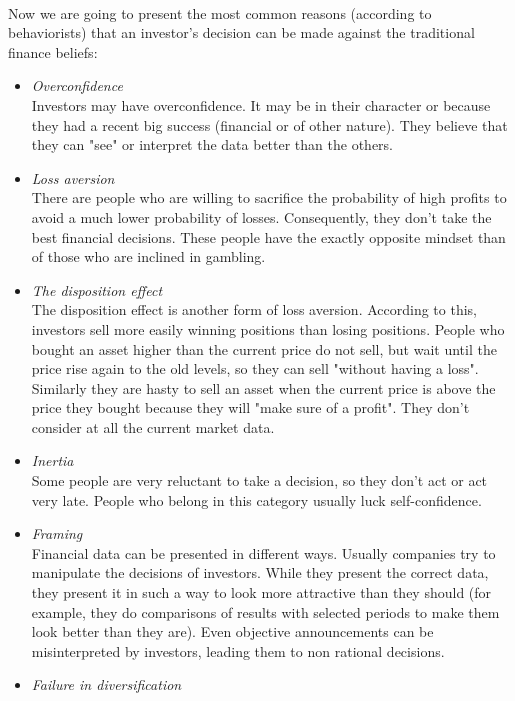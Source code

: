 \documentclass{article}
\begin{document}
\paragraph{ }
Now we are going to present the most common reasons (according to behaviorists) that an investor's decision can be made against the traditional finance beliefs:
\begin{itemize}
\item \emph{Overconfidence}\\
Investors may have overconfidence. It may be in their character or because they had a recent big success (financial or of other nature). They believe that they can "see" or interpret the data better than the others.
\item \emph{Loss aversion}\\
There are people who are willing to sacrifice the probability of high profits to avoid a much lower probability of losses. Consequently, they don't take the best financial decisions. These people have the exactly opposite mindset than of those who are inclined in gambling. 
\item \emph{The disposition effect}\\
The disposition effect is another form of loss aversion. According to this, investors sell more easily winning positions than losing positions. People who bought an asset higher than the current price do not sell, but wait until the price rise again to the old levels, so they can sell "without having a loss". Similarly they are hasty to sell an asset when the current price is above the price they bought because they will "make sure of a profit". They don't consider at all the current market data.
\item \emph{Inertia}\\
Some people are very reluctant to take a decision, so they don't act or act very late. People who belong in this category usually luck self-confidence.
\item \emph{Framing}\\
Financial data can be presented in different ways. Usually companies try to manipulate the decisions of investors. While they present the correct data, they present it in such a way to look more attractive than they should (for example, they do comparisons of results with selected periods to make them look better than they are). Even objective announcements can be misinterpreted by investors, leading them to non rational decisions.
\item \emph{Failure in diversification}\\

\end{itemize}
\end{document}
